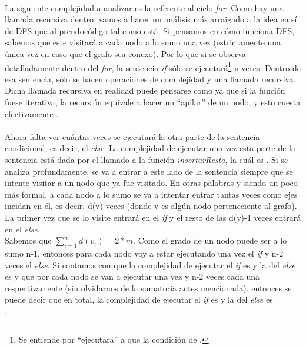 \paragraph{}
La siguiente complejidad a analizar es la referente al ciclo \textit{for}. Como hay una llamada recursiva dentro, vamos a hacer un análisis más arraigado a la idea en sí de DFS que al pseudocódigo tal como está. Si pensamos en cómo funciona DFS, sabemos que este visitará a cada nodo a lo sumo una vez (estrictamente una única vez en caso que el grafo sea conexo). Por lo que si se observa detalladamente dentro del \textit{for}, la sentencia \textit{if} sólo se ejecutará\footnote{Se entiende por ``ejecutará'' a que la condición de \true.} n veces. Dentro de esa sentencia, sólo se hacen operaciones de complejidad  y una llamada recursiva. Dicha llamada recursiva en realidad puede pensarse como  ya que si la función fuese iterativa, la recursión equivale a hacer un ``apilar'' de un nodo, y esto cuesta efectivamente .

\paragraph{}
Ahora falta ver cuántas veces se ejecutará la otra parte de la sentencia condicional, es decir, el  \textit{else}. La complejidad de ejecutar una vez esta parte de la sentencia está dada por el llamado a la función \textit{insertarResta}, la cuál es . Si se analiza profundamente, se va a entrar a este lado de la sentencia siempre que se intente visitar a un nodo que ya fue visitado. En otras palabras y siendo un poco más formal, a cada nodo a lo sumo se va a intentar entrar tantas veces como ejes incidan en él, es decir, d(v) veces (donde v es algún nodo perteneciente al grafo). La primer vez que se lo visite entrará en el \textit{if} y el resto de las d(v)-1 veces entrará en el \textit{else}.\\
Sabemos que $\sum_{i=1}^{n} d(v_i) = 2*m$. Como el grado de un nodo puede ser a lo sumo n-1, entonces para cada nodo voy a estar ejecutando una vez el \textit{if} y n-2 veces el \textit{else}. Si contamos con que la complejidad de ejecutar el \textit{if} es  y la del \textit{else} es  y que por cada nodo se van a ejecutar una vez y n-2 veces cada una respectivamente (sin olvidarnos de la sumatoria antes mencionada), entonces se puede decir que en total, la complejidad de ejecutar el \textit{if} es  y la del \textit{else} es  $==$ .

